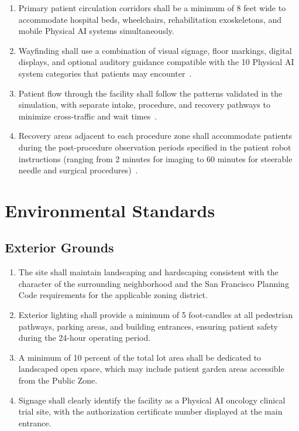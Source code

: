 \begin{enumerate}[label=(\alph*)]
\item Primary patient circulation corridors shall be a minimum of 8 feet wide
  to accommodate hospital beds, wheelchairs, rehabilitation exoskeletons, and
  mobile Physical AI systems simultaneously.

\item Wayfinding shall use a combination of visual signage, floor markings,
  digital displays, and optional auditory guidance compatible with the 10
  Physical AI system categories that patients may
  encounter~\cite{patientinstructions2026}.

\item Patient flow through the facility shall follow the patterns validated in
  the simulation, with separate intake, procedure, and recovery pathways to
  minimize cross-traffic and wait times~\cite{newtrial2026}.

\item Recovery areas adjacent to each procedure zone shall accommodate patients
  during the post-procedure observation periods specified in the patient robot
  instructions (ranging from 2 minutes for imaging to 60 minutes for steerable
  needle and surgical procedures)~\cite{patientinstructions2026}.
\end{enumerate}

\section{Environmental Standards}

\subsection{Exterior Grounds}

\begin{enumerate}[label=(\alph*)]
\item The site shall maintain landscaping and hardscaping consistent with the
  character of the surrounding neighborhood and the San Francisco Planning
  Code requirements for the applicable zoning district.

\item Exterior lighting shall provide a minimum of 5 foot-candles at all
  pedestrian pathways, parking areas, and building entrances, ensuring patient
  safety during the 24-hour operating period.

\item A minimum of 10 percent of the total lot area shall be dedicated to
  landscaped open space, which may include patient garden areas accessible from
  the Public Zone.

\item Signage shall clearly identify the facility as a Physical AI oncology
  clinical trial site, with the authorization certificate number displayed at
  the main entrance.
\end{enumerate}

